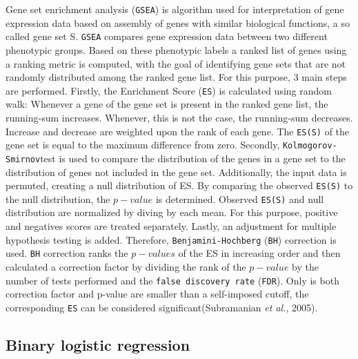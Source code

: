 \documentclass[
  parskip,
  oneside]{scrreprt}
\begin{document}
Gene set enrichment analysis (\texttt{GSEA}) is algorithm used for
interpretation of gene expression data based on assembly of genes with
similar biological functions, a so called gene set S. \texttt{GSEA}
compares gene expression data between two different phenotypic groups.
Based on these phenotypic labels a ranked list of genes using a ranking
metric is computed, with the goal of identifying gene sets that are not
randomly distributed among the ranked gene list. For this purpose, 3
main steps are performed. Firstly, the Enrichment Score (\texttt{ES}) is
calculated using random walk: Whenever a gene of the gene set is present
in the ranked gene list, the running-sum increases. Whenever, this is
not the case, the running-sum decreases. Increase and decrease are
weighted upon the rank of each gene. The \texttt{ES(S)} of the gene set
is equal to the maximum difference from zero. Secondly,
\texttt{Kolmogorov-Smirnov}test is used to compare the distribution of
the genes in a gene set to the distribution of genes not included in the
gene set. Additionally, the input data is permuted, creating a null
distribution of ES. By comparing the observed \texttt{ES(S)} to the null
distribution, the \(p-value\) is determined. Observed \texttt{ES(S)} and
null distribution are normalized by diving by each mean. For this
purpose, positive and negatives scores are treated separately. Lastly,
an adjustment for multiple hypothesis testing is added. Therefore,
\texttt{Benjamini-Hochberg} (\texttt{BH}) correction is used.
\texttt{BH} correction ranks the \(p-values\) of the ES in increasing
order and then calculated a correction factor by dividing the rank of
the \(p-value\) by the number of tests performed and the
\texttt{false\ discovery\ rate} (\texttt{FDR}). Only is both correction
factor and p-value are smaller than a self-imposed cutoff, the
corresponding \texttt{ES} can be considered significant(Subramanian
\emph{et al.}, 2005).

\hypertarget{binary-logistic-regression}{%
\subsection{Binary logistic
regression}\label{binary-logistic-regression}}
\end{document}
